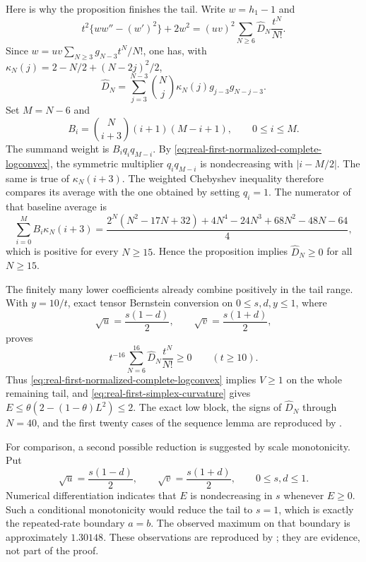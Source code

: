 \documentclass[11pt]{article}
\theoremstyle{remark}
\begin{document}
Here is why the proposition finishes the tail.  Write
$w=h_1-1$ and
\[
 t^2\{ww''-(w')^2\}+2w^2
 =(uv)^2\sum_{N\geq6}\widehat D_N\frac{t^N}{N!}.
\]
Since $w=uv\sum_{N\geq3}g_{N-3}t^N/N!$, one has, with
$\kappa_N(j)=2-N/2+(N-2j)^2/2$,
\[
 \widehat D_N=
 \sum_{j=3}^{N-3}\binom Nj\kappa_N(j)
 g_{j-3}g_{N-j-3}.
\]
Set $M=N-6$ and
\[
 B_i=\binom N{i+3}(i+1)(M-i+1),\qquad 0\leq i\leq M.
\]
The summand weight is $B_iq_iq_{M-i}$.  By
\eqref{eq:real-first-normalized-complete-logconvex}, the symmetric
multiplier $q_iq_{M-i}$ is nondecreasing with
$|i-M/2|$.  The same is true of $\kappa_N(i+3)$.  The weighted Chebyshev
inequality therefore compares its average with the one obtained by setting
$q_i=1$.  The numerator of that baseline average is
\begin{equation}\label{eq:real-first-baseline-coefficient}
 \sum_{i=0}^M B_i\kappa_N(i+3)
 =\frac{2^N(N^2-17N+32)+4N^4-24N^3+68N^2-48N-64}{4},
\end{equation}
which is positive for every $N\geq15$.  Hence the proposition implies
$\widehat D_N\geq0$ for all $N\geq15$.

The finitely many lower coefficients already combine positively in the
tail range.  With $y=10/t$, exact tensor Bernstein conversion on
$0\leq s,d,y\leq1$, where
\[
 \sqrt u=\frac{s(1-d)}2,\qquad
 \sqrt v=\frac{s(1+d)}2,
\]
proves
\begin{equation}\label{eq:real-first-variance-low-block}
 t^{-16}\sum_{N=6}^{16}\widehat D_N\frac{t^N}{N!}\geq0
 \qquad(t\geq10).
\end{equation}
Thus \eqref{eq:real-first-normalized-complete-logconvex} implies
$V\geq1$ on the whole remaining tail, and
\eqref{eq:real-first-simplex-curvature} gives
$E\leq\theta(2-(1-\theta)L^2)\leq2$.  The exact low block, the signs of
$\widehat D_N$ through $N=40$, and the first twenty cases of the sequence
lemma are reproduced by
.

For comparison, a second possible reduction is suggested by scale
monotonicity.  Put
\[
 \sqrt u=\frac{s(1-d)}2,\qquad
 \sqrt v=\frac{s(1+d)}2,\qquad 0\leq s,d\leq1.
\]
Numerical differentiation indicates that $E$ is nondecreasing in $s$
whenever $E\geq0$.  Such a conditional monotonicity would reduce the tail
to $s=1$, which is exactly the repeated-rate boundary $a=b$.  The observed
maximum on that boundary is approximately $1.30148$.  These observations
are reproduced by ; they are evidence,
not part of the proof.
\end{document}
